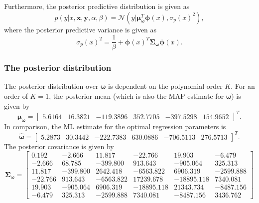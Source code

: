 \documentclass{article}
\begin{document}
Furthermore, the posterior predictive distribution is given as
\begin{equation}\label{eq:Q2_post_predict}
p(y \vert x, \mathbf{x}, \mathbf{y}, \alpha, \beta) = \mathcal{N}(y \vert \boldsymbol\mu^{T}_{\boldsymbol\omega} \boldsymbol\phi(x), \sigma_p(x)^2),
\end{equation}
where the posterior predictive variance is given as
\begin{equation}
\sigma_p(x)^2 = \frac{1}{\beta} + \boldsymbol\phi(x)^T \boldsymbol\Sigma_{\boldsymbol\omega}\boldsymbol\phi(x).
\end{equation}

\subsubsection*{The posterior distribution}
The posterior distribution over $\boldsymbol\omega$ is dependent on the polynomial order $K$. For an order of $K = 1$, the posterior mean (which is also the MAP estimate for $\boldsymbol\omega$) is given by
\begin{equation}
\boldsymbol\mu_{\boldsymbol\omega} = 
\begin{bmatrix}
5.6164 & 16.3821 & -119.3896 & 352.7705 & -397.5298 & 154.9652
\end{bmatrix}^T.
\end{equation}
In comparison, the ML estimate for the optimal regression parameters is
\begin{equation}
\hat{\boldsymbol\omega} = 
\begin{bmatrix}
5.2873 & 30.3442 & -222.7383 & 630.0886 & -706.5113 & 276.5713
\end{bmatrix}^T.
\end{equation}
The posterior covariance is given by
\begin{equation}
\boldsymbol\Sigma_{\boldsymbol\omega} = 
\begin{bmatrix}
 0.192 & -2.666 & 11.817 & -22.766 &  19.903 & -6.479 \\
-2.666 & 68.785 & -399.800 & 913.643 & -905.064 &  325.313  \\
11.817 & -399.800 & 2642.418 & -6563.822 & 6906.319 & -2599.888 \\
-22.766 & 913.643 & -6563.822 & 17239.678 & -18895.118 & 7340.081 \\
19.903 & -905.064 & 6906.319 & -18895.118 & 21343.734 & -8487.156 \\
-6.479 & 325.313 & -2599.888 & 7340.081 & -8487.156 & 3436.762
\end{bmatrix}
\end{equation}
\end{document}
